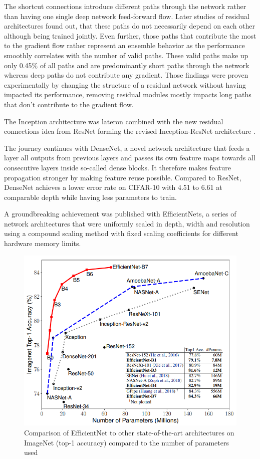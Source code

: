 The shortcut connections introduce different paths through the network rather than having one single deep network feed-forward flow. Later studies of residual architectures found out, that these paths do not necessarily depend on each other although being trained jointly. Even further, those paths that contribute the most to the gradient flow rather represent an ensemble behavior as the performance smoothly correlates with the number of valid paths. These valid paths make up only 0.45\% of all paths and are predominantly short paths through the network whereas deep paths do not contribute any gradient. Those findings were proven experimentally by changing the structure of a residual network without having impacted its performance, removing residual modules mostly impacts long paths that don't contribute to the gradient flow. \cite{AndreasVeit.2016}

The Inception architecture was lateron combined with the new residual connections idea from ResNet forming the revised Inception-ResNet architecture \cite{ChristianSzegedy.2016}.

The journey continues with DenseNet, a novel network architecture that feeds a layer all outputs from previous layers and passes its own feature maps towards all consecutive layers inside so-called dense blocks. It therefore makes feature propagation stronger by making feature reuse possible. Compared to ResNet, DenseNet achieves a lower error rate on CIFAR-10 with 4.51 to 6.61 at comparable depth while having less parameters to train. \cite{GaoHuang.2016}

A groundbreaking achievement was published with EfficientNets, a series of network architectures that were uniformly scaled in depth, width and resolution using a compound scaling method with fixed scaling coefficients for different hardware memory limits. 

\begin{figure}[t]
	\begin{center}
		\includegraphics[width=0.8\linewidth]{images/efficientnet.PNG}
	\end{center}
	\caption{Comparison of EfficientNet to other state-of-the-art architectures on ImageNet (top-1 accuracy) compared to the number of parameters used}
	\label{fig:efficientnet}
\end{figure}

